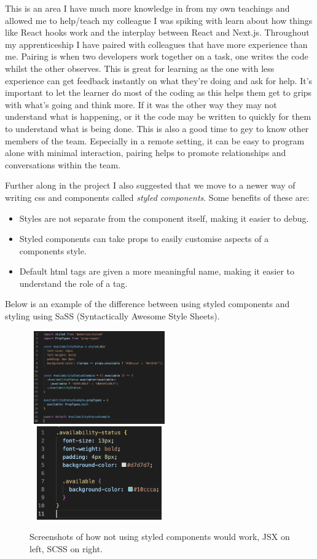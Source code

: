   This is an area I have much more knowledge in from my own teachings and allowed me to help/teach my colleague I was spiking with learn
  about how things like React hooks work and the interplay between React and Next.js. Throughout my apprenticeship I have paired with colleagues 
  that have more experience than me. Pairing is when two developers work together on a task, one writes the code whilst the other observes. This is great 
  for learning as the one with less experience can get feedback instantly on what they're doing and ask for help. It's important to let the learner 
  do most of the coding as this helps them get to grips with what's going and think more. If it was the other way they may not understand what is 
  happening, or it the code may be written to quickly for them to understand what is being done. This is also a good time to gey to know other 
  members of the team. Especially in a remote setting, it can be easy to program alone with minimal interaction, pairing helps to promote 
  relationships and conversations within the team.

  Further along in the project I also suggested that we move to a newer way of writing css and components called \textit{styled components}. Some benefits of
  these are:
  \begin{itemize}
    \item Styles are not separate from the component itself, making it easier to debug.
    \item Styled components can take props to easily customise aspects of a components style.
    \item Default html tags are given a more meaningful name, making it easier to understand the role of a tag.
  \end{itemize}

  Below is an example of the difference between using styled components and styling using SaSS (Syntactically Awesome Style Sheets).

  \begin{figure}[H]
    \centering
    \includegraphics[width=6cm, height=4cm]{assets/StyledCompsOldJSX.png}
    \includegraphics[width=6cm, height=4cm]{assets/styledCompsOldCSS.png}
    \caption{Screenshots of how not using styled components would work, JSX on left, SCSS on right.}
    \label{fig:oldStyling}
  \end{figure}


